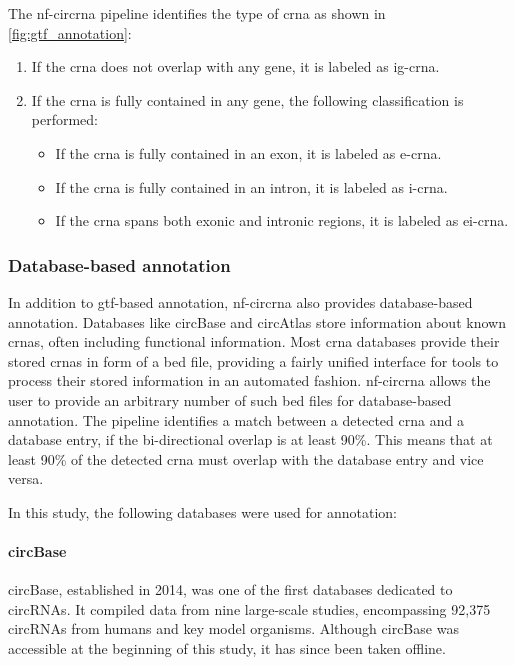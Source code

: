 The \gls{nf-circrna} pipeline identifies the type of \gls{crna} as shown in
\cref{fig:gtf_annotation}: \begin{enumerate} \item If the \gls{crna} does not
          overlap with any gene, it is labeled as \gls{ig-crna}.
    \item If the \gls{crna} is fully contained in any gene, the following
          classification is performed:
          \begin{itemize}
              \item If the \gls{crna} is fully contained in an exon, it is
                    labeled as \gls{e-crna}.
              \item If the \gls{crna} is fully contained in an intron, it
                    is
                    labeled as \gls{i-crna}.
              \item If the \gls{crna} spans both exonic and intronic
                    regions,
                    it is labeled as \gls{ei-crna}.
          \end{itemize}
\end{enumerate}

\subsubsection{Database-based annotation}
\label{sec:database_annotation}
In addition to \gls{gtf}-based annotation, \gls{nf-circrna} also provides
database-based annotation.
Databases like circBase and circAtlas store information about known
\glspl{crna}, often including functional
information\supercite{glazar_circbase_2014,wu_circatlas_2023}.
Most \gls{crna} databases provide their stored \glspl{crna} in form of a
\gls{bed} file, providing a fairly unified interface for tools to process their
stored information in an automated fashion.
\gls{nf-circrna} allows the user to provide an arbitrary number of such
\gls{bed}
files for database-based annotation.
The pipeline identifies a match between a detected \gls{crna} and a database
entry, if the bi-directional overlap is at least 90\%.
This means that at least 90\% of the detected \gls{crna} must overlap with the
database entry and vice versa.

In this study, the following databases were used for annotation:

\paragraph{circBase} circBase, established in 2014, was one of the first
databases dedicated to circRNAs.
It compiled data from nine large-scale studies, encompassing 92,375 circRNAs
from humans and key model organisms\supercite{glazar_circbase_2014}.
Although circBase was accessible at the beginning of this study, it has since
been taken offline.

